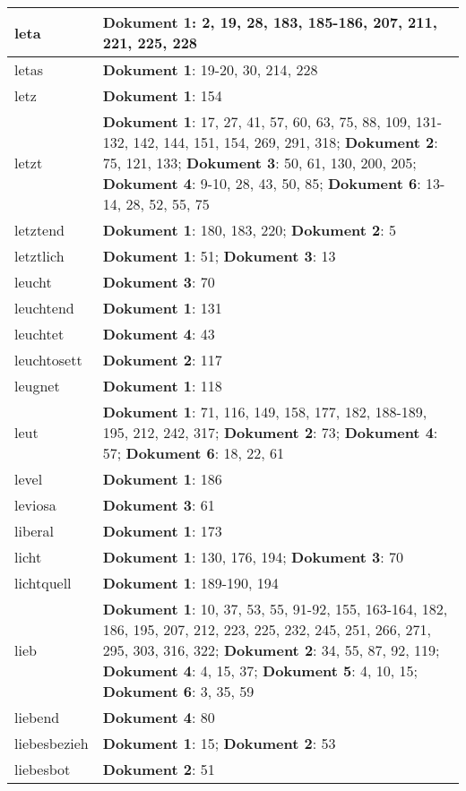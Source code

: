 \documentclass[a5paper]{article}
\begin{document}
\begin{longtable}[l]{|l|p{3in}|}
\hline
leta & \textbf{Dokument 1}: 2, 19, 28, 183, 185-186, 207, 211, 221, 225, 228 \\
\hline
letas & \textbf{Dokument 1}: 19-20, 30, 214, 228 \\
\hline
letz & \textbf{Dokument 1}: 154 \\
\hline
letzt & \textbf{Dokument 1}: 17, 27, 41, 57, 60, 63, 75, 88, 109, 131-132, 142, 144, 151, 154, 269, 291, 318; \textbf{Dokument 2}: 75, 121, 133; \textbf{Dokument 3}: 50, 61, 130, 200, 205; \textbf{Dokument 4}: 9-10, 28, 43, 50, 85; \textbf{Dokument 6}: 13-14, 28, 52, 55, 75 \\
\hline
letztend & \textbf{Dokument 1}: 180, 183, 220; \textbf{Dokument 2}: 5 \\
\hline
letztlich & \textbf{Dokument 1}: 51; \textbf{Dokument 3}: 13 \\
\hline
leucht & \textbf{Dokument 3}: 70 \\
\hline
leuchtend & \textbf{Dokument 1}: 131 \\
\hline
leuchtet & \textbf{Dokument 4}: 43 \\
\hline
leuchtosett & \textbf{Dokument 2}: 117 \\
\hline
leugnet & \textbf{Dokument 1}: 118 \\
\hline
leut & \textbf{Dokument 1}: 71, 116, 149, 158, 177, 182, 188-189, 195, 212, 242, 317; \textbf{Dokument 2}: 73; \textbf{Dokument 4}: 57; \textbf{Dokument 6}: 18, 22, 61 \\
\hline
level & \textbf{Dokument 1}: 186 \\
\hline
leviosa & \textbf{Dokument 3}: 61 \\
\hline
liberal & \textbf{Dokument 1}: 173 \\
\hline
licht & \textbf{Dokument 1}: 130, 176, 194; \textbf{Dokument 3}: 70 \\
\hline
lichtquell & \textbf{Dokument 1}: 189-190, 194 \\
\hline
lieb & \textbf{Dokument 1}: 10, 37, 53, 55, 91-92, 155, 163-164, 182, 186, 195, 207, 212, 223, 225, 232, 245, 251, 266, 271, 295, 303, 316, 322; \textbf{Dokument 2}: 34, 55, 87, 92, 119; \textbf{Dokument 4}: 4, 15, 37; \textbf{Dokument 5}: 4, 10, 15; \textbf{Dokument 6}: 3, 35, 59 \\
\hline
liebend & \textbf{Dokument 4}: 80 \\
\hline
liebesbezieh & \textbf{Dokument 1}: 15; \textbf{Dokument 2}: 53 \\
\hline
liebesbot & \textbf{Dokument 2}: 51 \\
\hline

\end{longtable}
\end{document}
